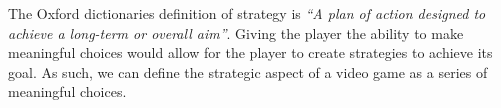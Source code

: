 The Oxford dictionaries definition of strategy is \textit{``A plan of action designed to achieve a long-term or overall aim''}.\cite{strategyOx}
Giving the player the ability to make meaningful choices would allow for the player to create strategies to achieve its goal.
As such, we can define the strategic aspect of a video game as a series of meaningful choices.\\
